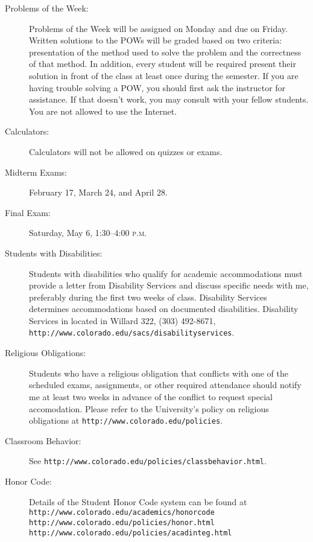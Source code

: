\documentclass[11pt]{article}
\newcommand{\PM}{\textsc{p.m.}}
\newcommand{\url}[1]{\texttt{#1}}
\begin{document}
\begin{description}
\item[Problems of the Week: ]
Problems of the Week will be assigned on Monday and due on Friday. Written solutions to the POWs will be graded based on two criteria: presentation of the method used to solve the problem and the correctness of that method. In addition, every student will be required present their solution in front of the class at least once during the semester. If you are having trouble solving a POW, you should first ask the instructor for assistance. If that doesn't work, you may consult with your fellow students. You are not allowed to use the Internet.

\item[Calculators: ] Calculators will not be allowed on quizzes or exams.

\item[Midterm Exams: ]
February 17, March 24, and April 28.

\item[Final Exam: ]
Saturday, May 6, 1:30--4:00 \PM

\pagebreak

\item[Students with Disabilities: ]
Students with disabilities who qualify for academic accommodations must provide a letter from Disability Services and discuss specific needs with me, preferably during the first two weeks of class.  Disability Services determines accommodations based on documented disabilities. Disability Services in located in Willard 322, (303) 492-8671, \\ \url{http://www.colorado.edu/sacs/disabilityservices}.

\item[Religious Obligations: ]
Students who have a religious obligation that conflicts with one of the scheduled exams, assignments, or other required attendance should notify me at least two weeks in advance of the conflict to request special accomodation. Please refer to the University's policy on religious obligations at \url{http://www.colorado.edu/policies}.

\item[Classroom Behavior: ]
See \url{http://www.colorado.edu/policies/classbehavior.html}.

\item[Honor Code: ] 
Details of the Student Honor Code system can be found at \\
\url{http://www.colorado.edu/academics/honorcode} \\
\url{http://www.colorado.edu/policies/honor.html} \\
\url{http://www.colorado.edu/policies/acadinteg.html}


\end{description}
\end{document}
